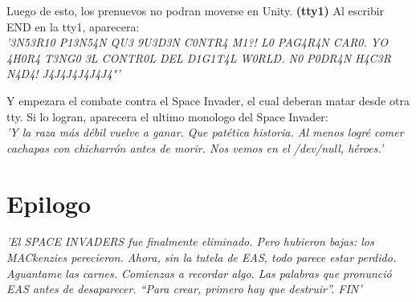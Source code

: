 \documentclass[a4paper,10pt]{article}
\begin{document}
	Luego de esto, los prenuevos no podran moverse en Unity. \textbf{(tty1)} Al escribir END en la tty1, aparecera:\\
	
	\textit{'3N53R10 P13N54N QU3 9U3D3N C0NTR4 M1?! L0 PAG4R4N CAR0. YO 4H0R4 T3NG0 3L CONTR0L DEL D1G1T4L W0RLD. N0 P0DR4N H4C3R N4D4! J4J4J4J4J4J4"'\\}
	
	Y empezara el combate contra el Space Invader, el cual deberan matar desde otra tty. Si lo logran, aparecera el ultimo monologo del Space Invader:\\
	
	\textit{'Y la raza más débil vuelve a ganar. Que patética historia. Al menos logré comer cachapas con chicharrón antes de morir. Nos vemos en el /dev/null, héroes.'\\}
	

\section{Epilogo}
	\textit{'El SPACE INVADERS fue finalmente eliminado. Pero hubieron bajas: los MACkenzies perecieron. Ahora, sin la tutela de EAS, todo parece estar perdido. Aguantame las carnes. Comienzas a recordar algo. Las palabras que pronunció EAS antes de desaparecer. “Para crear, primero hay que destruir”. FIN'}

	
	

	
	
	
\end{document}
